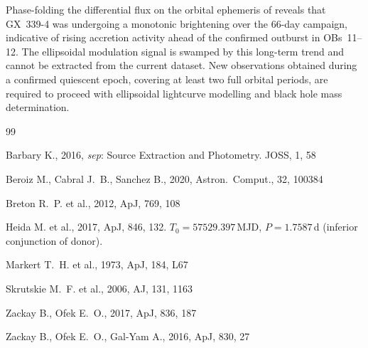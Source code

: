 \documentclass[12pt,a4paper]{article}
\begin{document}
Phase-folding the differential flux on the orbital ephemeris of
\citet{Heida2017} reveals that GX~339-4 was undergoing a monotonic brightening
over the 66-day campaign, indicative of rising accretion activity ahead of the
confirmed outburst in OBs~11--12. The ellipsoidal modulation signal is
swamped by this long-term trend and cannot be extracted from the current
dataset. New observations obtained during a confirmed quiescent epoch, covering
at least two full orbital periods, are required to proceed with ellipsoidal
lightcurve modelling and black hole mass determination.

\begin{thebibliography}{99}

Barbary K., 2016, \textit{sep}: Source Extraction and Photometry.
JOSS, 1, 58

Beroiz M., Cabral J.~B., Sanchez B., 2020, Astron.\ Comput., 32, 100384

Breton R.~P. et al., 2012, ApJ, 769, 108

Heida M. et al., 2017, ApJ, 846, 132.
$T_0 = 57529.397$\,MJD, $P = 1.7587$\,d (inferior conjunction of donor).

Markert T.~H. et al., 1973, ApJ, 184, L67

Skrutskie M.~F. et al., 2006, AJ, 131, 1163

Zackay B., Ofek E.~O., 2017, ApJ, 836, 187

Zackay B., Ofek E.~O., Gal-Yam A., 2016, ApJ, 830, 27

\end{thebibliography}
\end{document}
